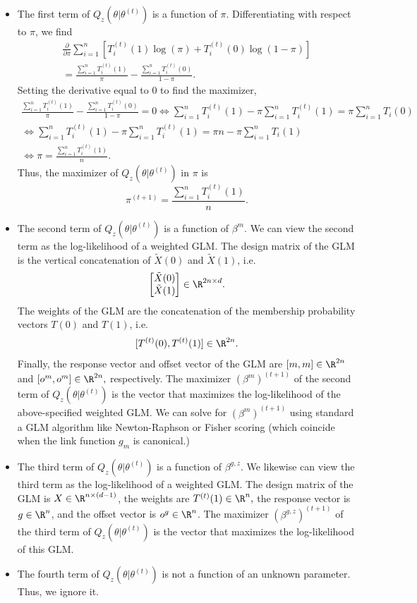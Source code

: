 \documentclass[12pt]{article}
\begin{document}
\begin{itemize}
	\item The first term of $Q_z(\theta | \theta^{(t)})$ is a function of $\pi$. Differentiating with respect to $\pi$, we find
	\begin{multline*}
	\frac{ \partial }{\partial \pi } \sum_{i=1}^n \left[ T^{(t)}_i(1)\log(\pi) + T_i^{(t)}(0) \log(1 - \pi)\right]  \\ = \frac{\sum_{i=1}^n T_i^{(t)}(1)}{\pi} - \frac{ \sum_{i=1}^n T_i^{(t)}(0) }{ 1 - \pi}.
	\end{multline*} Setting the derivative equal to $0$ to find the maximizer,
	\begin{multline*}
	\frac{\sum_{i=1}^n T_i^{(t)}(1)}{\pi} - \frac{ \sum_{i=1}^n T_i^{(t)}(0) }{ 1 - \pi} = 0 \iff \sum_{i=1}^n T_i^{(t)}(1) - \pi \sum_{i=1}^n T^{(t)}_i(1) = \pi \sum_{i=1}^n T_i(0) \\ \iff \sum_{i=1}^n T^{(t)}_i(1) - \pi\sum_{i=1}^n T_i^{(t)}(1) = \pi n - \pi\sum_{i=1}^n T_i(1) \\ \iff \pi = \frac{ \sum_{i=1}^n T_i^{(t)} (1) }{n}.\end{multline*}
	Thus, the maximizer of $Q_z(\theta| \theta^{(t)})$ in $\pi$ is $$ \pi^{(t+1)} = \frac{ \sum_{i=1}^n T_i^{(t)}(1) }{n}.$$
	\item The second term of $Q_z(\theta | \theta^{(t)})$ is a function of $\beta^m$. We can view the second term as the log-likelihood of a weighted GLM. The design matrix of the GLM is the vertical concatenation of $\tilde{X}(0)$ and $\tilde{X}(1)$, i.e.
	$$ \begin{bmatrix} \tilde{X}(0) \\ \tilde{X}(1) \end{bmatrix} \in \R^{2n \times d}.$$ The weights of the GLM are the concatenation of the membership probability vectors $T(0)$ and $T(1)$, i.e. $$ [T^{(t)}(0), T^{(t)}(1)] \in \R^{2n}.$$ Finally, the response vector and offset vector of the GLM are
	$[m, m] \in \R^{2n}$ and $[ o^m, o^m ] \in \R^{2n},$ respectively. The maximizer $(\beta^m)^{(t + 1)}$ of the second term of $Q_z(\theta|\theta^{(t)})$ is the vector that maximizes the log-likelihood of the above-specified weighted GLM. 
	We can solve for $(\beta^{m})^{(t+1)}$ using standard a GLM algorithm like Newton-Raphson or Fisher scoring (which coincide when the link function $g_m$ is canonical.)
	\item The third term of $Q_z(\theta | \theta^{(t)})$ is a function of $\beta^{g, z}$. We likewise can view the third term as the log-likelihood of a weighted GLM. The design matrix of the GLM is $X \in \R^{n \times (d - 1)}$, the weights are $T^{(t)}(1) \in \R^n,$  the response vector is $g \in \R^n$, and the offset vector is $o^g \in \R^n$. The maximizer $(\beta^{g,z})^{(t+1)}$ of the third term of $Q_z(\theta| \theta^{(t)})$ is the vector that maximizes the log-likelihood of this GLM.
	\item The fourth term of $Q_z(\theta|\theta^{(t)})$ is not a function of an unknown parameter. Thus, we ignore it.
\end{itemize}
\end{document}
